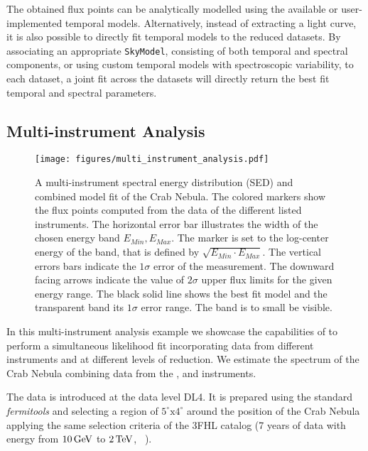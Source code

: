 \documentclass[traditabstract, longauth]{aa}
\newcommand{\code}[1]{\texttt{#1}}
\begin{document}
%
The obtained flux points can be analytically modelled using the available or
user-implemented temporal models. Alternatively, instead of  extracting a
light curve, it is also possible to directly fit temporal models to the reduced
datasets. By associating an appropriate \code{SkyModel}, consisting of both temporal
and spectral components, or using custom temporal models with spectroscopic
variability, to each dataset, a joint fit across the datasets will directly
return the best fit temporal and spectral parameters.

\subsection{Multi-instrument Analysis}
\label{ssec:multi-instrument-analysis}
%
\begin{figure*}[t]
	\sidecaption
	\texttt{[image: figures/multi\_instrument\_analysis.pdf]}
	\caption{
        A multi-instrument spectral energy distribution (SED) and combined model fit
        of the Crab Nebula. The  colored markers show the flux points computed from
        the data of the different listed instruments. The horizontal error bar
        illustrates the width of the chosen energy band $E_{Min}, E_{Max}$.
        The marker is set to the log-center energy of the band, that is
        defined by $\sqrt{E_{Min} \cdot E_{Max}}$. The vertical errors bars
        indicate the $1\sigma$ error of the measurement. The downward
        facing arrows indicate the value of $2\sigma$ upper flux limits
        for the given energy range. The black solid line shows the best
        fit model and the transparent band its $1\sigma$ error range.
		The band is to small be visible.
    }
	\label{fig:multi_instrument_analysis}
\end{figure*}
%
In this multi-instrument analysis example we showcase the capabilities of
\gammapy to perform a simultaneous likelihood fit incorporating data from
different instruments and at different levels of reduction. We estimate the
spectrum of the Crab Nebula combining data from the \fermi, \magic and \hawc
instruments.

The \fermi data is introduced at the data level DL4. It is prepared 
using the standard \textit{fermitools} \citep{Fermitools2019} and
selecting a region of $5^{\circ} \mathrm{x} 4^{\circ}$ around the
position of the Crab Nebula applying the same selection criteria of the 3FHL
catalog (7 years of data with energy from $10\,{\rm GeV}$ to $2\,{\rm TeV}$,
~\citealt{3FHL}).
\end{document}
